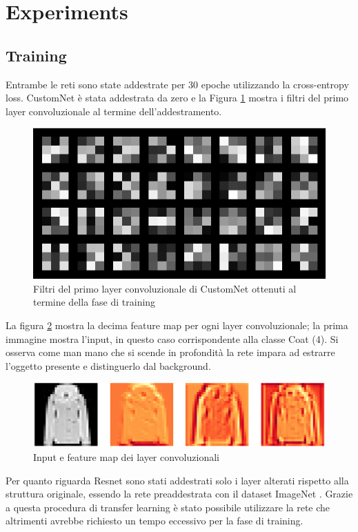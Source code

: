 \section{Experiments} \label{sec:experiments}
\subsection*{Training}
Entrambe le reti sono state addestrate per 30 epoche utilizzando la cross-entropy loss. CustomNet è stata addestrata da zero e la Figura \ref{fig7:layer1_filter} mostra i filtri del primo layer convoluzionale al termine dell'addestramento. 
\begin{figure}[!hbt]
    \centering
    \includegraphics[width=\columnwidth]{images/layer1_filter.png}
    \caption{Filtri del primo layer convoluzionale di CustomNet ottenuti al termine della fase di training}
    \label{fig7:layer1_filter}
\end{figure}\par
La figura \ref{fig8:feature_map} mostra la decima feature map per ogni layer convoluzionale; la prima immagine mostra l'input, in questo caso corrispondente alla classe Coat (4). Si osserva come man mano che si scende in profondità la rete impara ad estrarre l'oggetto presente e distinguerlo dal background.
\begin{figure}[!hbt]
    \centering
    \includegraphics[width=\columnwidth]{images/customNet_featureMap2.png}
    \caption{Input e feature map dei layer convoluzionali}
    \label{fig8:feature_map}
\end{figure}\par
Per quanto riguarda Resnet sono stati addestrati solo i layer alterati rispetto alla struttura originale, essendo la rete preaddestrata con il dataset ImageNet \cite{deng2009imagenet}. Grazie a questa procedura di transfer learning è stato possibile utilizzare la rete che altrimenti avrebbe richiesto un tempo eccessivo per la fase di training.
